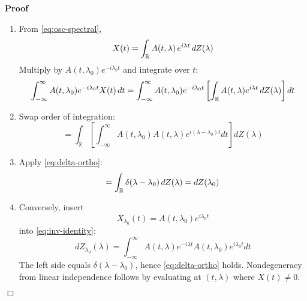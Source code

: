 \documentclass{article}
\newenvironment{proof}{\noindent\textbf{Proof\ }}{\hspace*{\fill}$\Box$\medskip}
\begin{document}
\begin{proof}
  \begin{enumerate}
    \item From \eqref{eq:osc-spectral},
    \begin{equation}
      X (t) = \int_{\mathbb{R}} A (t, \lambda)  \hspace{0.17em} e^{i \lambda
      t}  \hspace{0.17em} dZ (\lambda)
    \end{equation}
    Multiply by $A (t, \lambda_0) e^{- i \lambda_0 t}$ and integrate over $t$:
    \begin{equation}
      \int_{- \infty}^{\infty} A (t, \lambda_0) e^{- i \lambda_0 t} X (t) 
      \hspace{0.17em} dt = \int_{- \infty}^{\infty} A (t, \lambda_0) e^{- i
      \lambda_0 t} \left[ \int_{\mathbb{R}} A (t, \lambda) e^{i \lambda t} 
      \hspace{0.17em} dZ (\lambda) \right] dt
    \end{equation}
    \item Swap order of integration:
    \begin{equation}
      = \int_{\mathbb{R}} \left[ \int_{- \infty}^{\infty} A (t, \lambda_0) A
      (t, \lambda) e^{i (\lambda - \lambda_0) t} dt \right] dZ (\lambda)
    \end{equation}
    \item Apply \eqref{eq:delta-ortho}:
    \begin{equation}
      = \int_{\mathbb{R}} \delta (\lambda - \lambda_0)  \hspace{0.17em} dZ
      (\lambda) = dZ (\lambda_0)
    \end{equation}
    \item Conversely, insert
    \begin{equation}
      X_{\lambda_0} (t) = A (t, \lambda_0) e^{i \lambda_0 t}
    \end{equation}
    into \eqref{eq:inv-identity}:
    \begin{equation}
      dZ_{\lambda_0} (\lambda) = \int_{- \infty}^{\infty} A (t, \lambda) e^{-
      i \lambda t} A (t, \lambda_0) e^{i \lambda_0 t} dt
    \end{equation}
    The left side equals $\delta (\lambda - \lambda_0)$, hence
    \eqref{eq:delta-ortho} holds. Nondegeneracy from linear independence
    follows by evaluating at $(t, \lambda)$ where $X (t) \neq 0$.
  \end{enumerate}
  
\end{proof}
\end{document}
